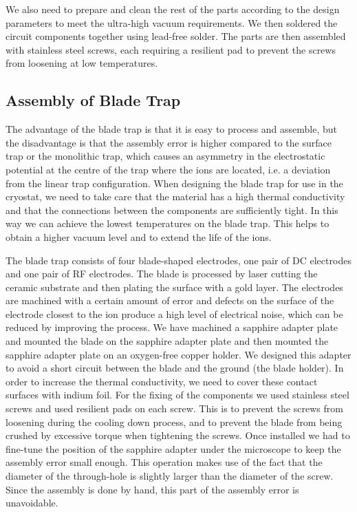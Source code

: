 We also need to prepare and clean the rest of the parts according to the design parameters to meet the ultra-high vacuum requirements. We then soldered the circuit components together using lead-free solder. The parts are then assembled with stainless steel screws, each requiring a resilient pad to prevent the screws from loosening at low temperatures.

\subsection{Assembly of Blade Trap}

The advantage of the blade trap is that it is easy to process and assemble, but the disadvantage is that the assembly error is higher compared to the surface trap or the monolithic trap, which causes an asymmetry in the electrostatic potential at the centre of the trap where the ions are located, i.e. a deviation from the linear trap configuration. When designing the blade trap for use in the cryostat, we need to take care that the material has a high thermal conductivity and that the connections between the components are sufficiently tight. In this way we can achieve the lowest temperatures on the blade trap. This helps to obtain a higher vacuum level and to extend the life of the ions.

The blade trap consists of four blade-shaped electrodes, one pair of DC electrodes and one pair of RF electrodes. The blade is processed by laser cutting the ceramic substrate and then plating the surface with a gold layer. The electrodes are machined with a certain amount of error and defects on the surface of the electrode closest to the ion produce a high level of electrical noise, which can be reduced by improving the process. We have machined a sapphire adapter plate and mounted the blade on the sapphire adapter plate and then mounted the sapphire adapter plate on an oxygen-free copper holder. We designed this adapter to avoid a short circuit between the blade and the ground (the blade holder). In order to increase the thermal conductivity, we need to cover these contact surfaces with indium foil. For the fixing of the components we used stainless steel screws and used resilient pads on each screw. This is to prevent the screws from loosening during the cooling down process, and to prevent the blade from being crushed by excessive torque when tightening the screws. Once installed we had to fine-tune the position of the sapphire adapter under the microscope to keep the assembly error small enough. This operation makes use of the fact that the diameter of the through-hole is slightly larger than the diameter of the screw. Since the assembly is done by hand, this part of the assembly error is unavoidable.

